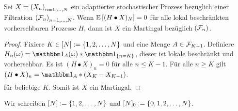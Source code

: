\begin{korollar} %
	Sei $X = \left( X_n \right)_{n=1 , \dots, N}$ ein adaptierter stochastischer Prozess bezüglich einer Filtration $\left( \mathcal{F}_n \right)_{n=1 , \dots, N}$. Wenn $\mathbb{E} \left[ (H \bullet X)_N \right] = 0$ für alle lokal beschränkten vorhersehbaren Prozesse $H$, dann ist $X$ ein Martingal bezüglich $\left( \mathcal{F}_n \right)_{}$.
\end{korollar}
\begin{proof}
	Fixiere $K \in  [N] \mathrel{:=} \left\{ 1, 2, \dots , N \right\}$ und eine Menge $A \in \mathcal{F}_{K-1}$. Definiere $H_n(\omega) = \one_A (\omega) * \one_{\menge{n=K}}$, dieser ist lokale beschränkt und vorhersehbar.
	Es ist $(H \bullet X)_n = 0$ für alle $n \le K-1$. Für alle $n \ge K$ gilt $(H \bullet X)_n = \one_A * (X_K - X_{K-1})$. 
	\begin{align*}
	\end{align*}
	für beliebige $K$. Somit ist $X$ ein Martingal.
\end{proof}

\begin{bemerkung}
	Wir schreiben $[N] \mathrel{:=} \left\{ 1, 2, \dots, N \right\}$ und $[N]_0 \mathrel{:=} \left\{ 0, 1, 2 , \dots , N \right\}$.
\end{bemerkung}
